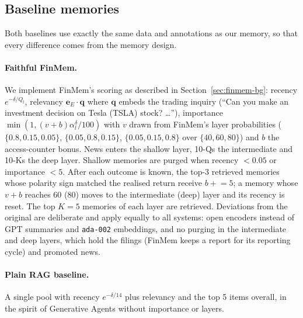 \subsection{Baseline memories}
\label{sec:finmem-impl}
Both baselines use exactly the same data and annotations as our memory, so that every difference comes from the memory design.

\paragraph{Faithful FinMem.} We implement FinMem's scoring as described in Section~\ref{sec:finmem-bg}: recency $e^{-\delta/Q_l}$, relevancy $\mathbf{e}_E\cdot\mathbf{q}$ where $\mathbf{q}$ embeds the trading inquiry (``Can you make an investment decision on Tesla (TSLA) stock? \dots''), importance $\min(1,(v+b)\alpha_l^{\delta}/100)$ with $v$ drawn from FinMem's layer probabilities ($\{0.8,0.15,0.05\}$, $\{0.05,0.8,0.15\}$, $\{0.05,0.15,0.8\}$ over $\{40,60,80\}$) and $b$ the access-counter bonus. News enters the shallow layer, 10-Qs the intermediate and 10-Ks the deep layer. Shallow memories are purged when recency $<0.05$ or importance $<5$. After each outcome is known, the top-3 retrieved memories whose polarity sign matched the realised return receive $b \mathrel{+}= 5$; a memory whose $v+b$ reaches 60 (80) moves to the intermediate (deep) layer and its recency is reset. The top $K=5$ memories of each layer are retrieved. Deviations from the original are deliberate and apply equally to all systems: open encoders instead of GPT summaries and \texttt{ada-002} embeddings, and no purging in the intermediate and deep layers, which hold the filings (FinMem keeps a report for its reporting cycle) and promoted news.

\paragraph{Plain RAG baseline.} A single pool with recency $e^{-\delta/14}$ plus relevancy and the top 5 items overall, in the spirit of Generative Agents without importance or layers.


